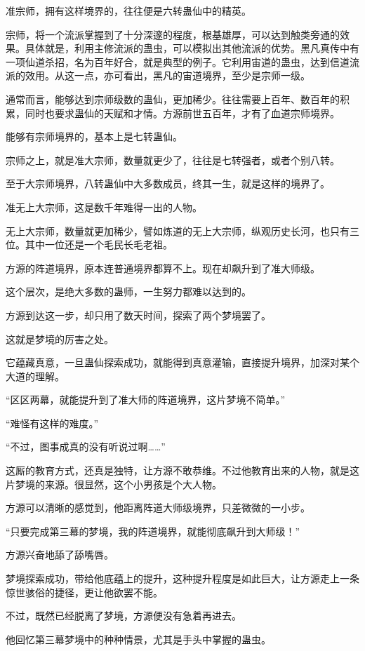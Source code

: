 \begin{this_body}
准宗师，拥有这样境界的，往往便是六转蛊仙中的精英。

宗师，将一个流派掌握到了十分深邃的程度，根基雄厚，可以达到触类旁通的效果。具体就是，利用主修流派的蛊虫，可以模拟出其他流派的优势。黑凡真传中有一项仙道杀招，名为百年好合，就是典型的例子。它利用宙道的蛊虫，达到信道流派的效用。从这一点，亦可看出，黑凡的宙道境界，至少是宗师一级。

通常而言，能够达到宗师级数的蛊仙，更加稀少。往往需要上百年、数百年的积累，同时也要求蛊仙的天赋和才情。方源前世五百年，才有了血道宗师境界。

能够有宗师境界的，基本上是七转蛊仙。

宗师之上，就是准大宗师，数量就更少了，往往是七转强者，或者个别八转。

至于大宗师境界，八转蛊仙中大多数成员，终其一生，就是这样的境界了。

准无上大宗师，这是数千年难得一出的人物。

无上大宗师，数量就更加稀少，譬如炼道的无上大宗师，纵观历史长河，也只有三位。其中一位还是一个毛民长毛老祖。

方源的阵道境界，原本连普通境界都算不上。现在却飙升到了准大师级。

这个层次，是绝大多数的蛊师，一生努力都难以达到的。

方源到达这一步，却只用了数天时间，探索了两个梦境罢了。

这就是梦境的厉害之处。

它蕴藏真意，一旦蛊仙探索成功，就能得到真意灌输，直接提升境界，加深对某个大道的理解。

“区区两幕，就能提升到了准大师的阵道境界，这片梦境不简单。”

“难怪有这样的难度。”

“不过，图事成真的没有听说过啊……”

这厮的教育方式，还真是独特，让方源不敢恭维。不过他教育出来的人物，就是这片梦境的来源。很显然，这个小男孩是个大人物。

方源可以清晰的感觉到，他距离阵道大师级境界，只差微微的一小步。

“只要完成第三幕的梦境，我的阵道境界，就能彻底飙升到大师级！”

方源兴奋地舔了舔嘴唇。

梦境探索成功，带给他底蕴上的提升，这种提升程度是如此巨大，让方源走上一条惊世骇俗的捷径，更让他欲罢不能。

不过，既然已经脱离了梦境，方源便没有急着再进去。

他回忆第三幕梦境中的种种情景，尤其是手头中掌握的蛊虫。


\end{this_body}

